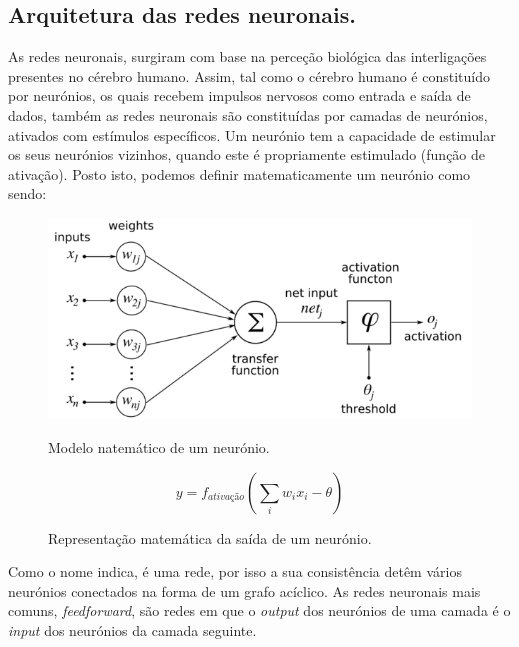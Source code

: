 \documentclass[]{article}
\begin{document}
\subsection{Arquitetura das redes neuronais.}
\label{sec:arquitetura}
	As redes neuronais, surgiram com base na perceção biológica das interligações presentes no cérebro humano. Assim, tal como o cérebro humano é constituído por neurónios, os quais recebem impulsos nervosos como entrada e saída de dados, também as redes neuronais são constituídas por camadas de neurónios, ativados com estímulos específicos. Um neurónio tem a capacidade de estimular os seus neurónios vizinhos, quando este é propriamente estimulado (função de ativação). Posto isto, podemos definir matematicamente um neurónio como sendo:
    \begin{figure}[H]
    \centering
    \includegraphics[scale=.5]{img/neural.png}
    \caption{Modelo natemático de um neurónio.}
    
    \LARGE{\[ y = f_\textit{ativação} (\sum_{i} w_ix_i - \theta ) \]}
    \caption{Representação matemática da saída de um neurónio.}
    \end{figure}
    
    Como o nome indica, é uma rede, por isso a sua consistência detêm vários neurónios conectados na forma de um grafo acíclico. As redes neuronais mais comuns, \textit{feedforward}, são redes em que o \textit{output} dos neurónios de uma camada é o \textit{input} dos neurónios da camada seguinte.
\end{document}
